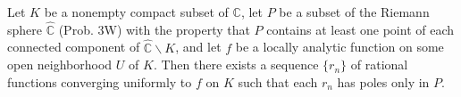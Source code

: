 Let $K$ be a nonempty compact subset of $\mathbb{C}$, let $P$ be a subset of the Riemann sphere $\hat{\mathbb{C}}$ (Prob. 3W) with the property that $P$ contains at least one point of each connected component of $\hat{\mathbb{C}}\backslash K$, and let $f$ be a locally analytic function on some open neighborhood $U$ of $K$. Then there exists a sequence $\{r_n\}$ of rational functions converging uniformly to $f$ on $K$ such that each $r_n$ has poles only in $P$.
